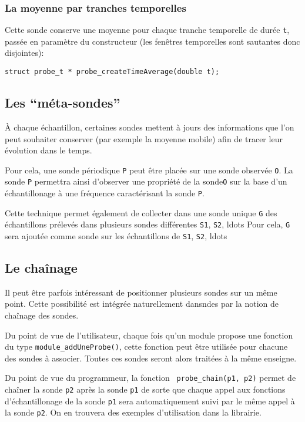 \subsubsection{La moyenne par tranches temporelles}

   Cette sonde conserve une moyenne pour chaque tranche temporelle de
durée {\tt t}, passée en paramètre du constructeur (les fenêtres
temporelles sont sautantes donc disjointes):

\begin{verbatim}
struct probe_t * probe_createTimeAverage(double t);
\end{verbatim}

%
\subsection{Les ``méta-sondes''}

   À chaque échantillon, certaines sondes mettent à jours des
informations que l'on peut souhaiter conserver (par exemple la moyenne
mobile) afin de tracer leur évolution dans le temps.

   Pour cela, une sonde périodique \lstinline!P! peut être placée sur
une sonde observée \lstinline!O!. La sonde \lstinline!P! permettra
ainsi d'observer une propriété de la sonde\lstinline!O! sur la base
d'un échantillonage à une fréquence caractérisant la sonde
\lstinline!P!. 

   Cette technique permet également de collecter dans une sonde unique
\lstinline!G! des échantillons prélevés dans plusieurs sondes
différentes \lstinline!S1!, \lstinline!S2!, ldots Pour cela,
\lstinline!G! sera ajoutée comme sonde sur les échantillons de
\lstinline!S1!, \lstinline!S2!, ldots 

%
\subsection{Le chaînage}

   Il peut être parfois intéressant de positionner plusieurs sondes
sur un même point. Cette possibilité est intégrée naturellement
dans{\sc ndes} par la notion de chaînage des sondes.

   Du point de vue de l'utilisateur, chaque fois qu'un module propose
une fonction du type {\tt module\_addUneProbe()}, cette fonction peut
être utilisée pour chacune des sondes à associer. Toutes ces sondes
seront alors traitées à la même enseigne.

   Du point de vue du programmeur, la fonction {\tt
probe\_chain(p1, p2)}  permet de chaîner la sonde
   {\tt p2} après la sonde {\tt p1} de sorte que chaque appel aux
     fonctions d'échantillonage de la sonde {\tt p1} sera
     automatiquement suivi par le même appel à la sonde {\tt p2}. On
     en trouvera des exemples d'utilisation dans la librairie.

